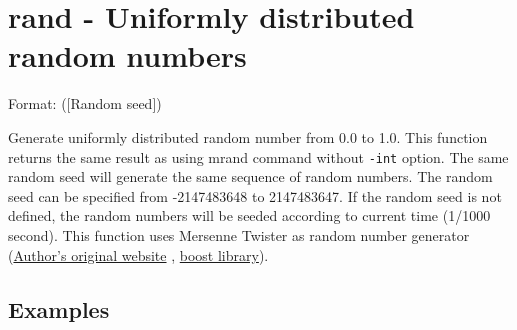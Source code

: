 
%

\section{rand - Uniformly distributed random numbers\label{sect:rand}}

Format: ([Random seed])

Generate uniformly distributed random number from 0.0 to 1.0. This function returns the same result as using mrand command without \verb|-int| option.
The same random seed will generate the same sequence of random numbers. The random seed can be specified from -2147483648 to 2147483647. If the random seed is not defined, the random numbers will be seeded according to current time (1/1000 second). 
This function uses Mersenne Twister as random number generator (\href{http://www.math.sci.hiroshima-u.ac.jp/~m-mat/MT/emt.html}{Author’s original website}
, \href{http://www.boost.org/doc/libs/1_54_0/doc/html/boost_random.html}{boost library}). 



\subsection*{Examples}


%
